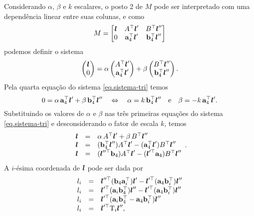 Considerando $\alpha$, $\beta$ e $k$ escalares, o posto 2 de $M$ pode ser interpretado com uma dependência linear entre suas colunas, e como
\begin{equation*}
M=
\begin{bmatrix}
\boldsymbol{l}&A^\top\boldsymbol{l}'&B^\top\boldsymbol{l}''\\
0&{\bf a}^\top_4\boldsymbol{l}'&
{\bf b}^\top_4\boldsymbol{l}''
\end{bmatrix}
\end{equation*}
podemos definir o sistema
\begin{equation}\label{eq.sistema-tri}
\begin{pmatrix}
\boldsymbol{l}\\
0
\end{pmatrix}
=
\alpha
\begin{pmatrix}
A^\top\boldsymbol{l}'\\
{\bf a}^\top_4\boldsymbol{l}'
\end{pmatrix}
+\beta
\begin{pmatrix}
B^\top\boldsymbol{l}''\\
{\bf b}^\top_4\boldsymbol{l}''
\end{pmatrix}.
\end{equation}
Pela quarta equação do sistema \ref{eq.sistema-tri} temos
\begin{equation*}
0=\alpha\,{\bf a}^\top_4\boldsymbol{l}'+\beta\,{\bf b}^\top_4\boldsymbol{l}''\quad\Leftrightarrow\quad\alpha=k\,{\bf b}^\top_4\boldsymbol{l}''\quad\text{e}\quad\beta=-k\,{\bf a}^\top_4\boldsymbol{l}'.
\end{equation*}
Substituindo os valores de $\alpha$ e $\beta$ nas três primeiras equações do sistema \ref{eq.sistema-tri} e desconsiderando o fator de escala $k$, temos
\begin{equation*}
\begin{array}{rcl}
\boldsymbol{l}&=&\alpha\,A^\top\boldsymbol{l}'+\beta\,B^\top\boldsymbol{l}''\\
\boldsymbol{l}&=&({\bf b}^\top_4\boldsymbol{l}'')A^\top\boldsymbol{l}'-({\bf a}^\top_4\boldsymbol{l}')B^\top\boldsymbol{l}''\\
\boldsymbol{l}&=&(\boldsymbol{l}''^\top{\bf b}_4)A^\top\boldsymbol{l}'-(\boldsymbol{l}'^\top{\bf a}_4)B^\top\boldsymbol{l}''
\end{array}.
\end{equation*}
A $i$-ésima coordenada de $\boldsymbol{l}$ pode ser dada por
\begin{equation*}
\begin{array}{rcl}
l_i&=&\boldsymbol{l}''^\top({\bf b}_4{\bf a}^\top_i)\boldsymbol{l}'-\boldsymbol{l}'^\top({\bf a}_4{\bf b}_i^\top)\boldsymbol{l}''\\
l_i&=&\boldsymbol{l}'^\top({\bf a}_i{\bf b}^\top_4)\boldsymbol{l}''-\boldsymbol{l}'^\top({\bf a}_4{\bf b}_i^\top)\boldsymbol{l}''\\
l_i&=&\boldsymbol{l}'^\top({\bf a}_i{\bf b}^\top_4-{\bf a}_4{\bf b}_i^\top)\boldsymbol{l}''\\
l_i&=&\boldsymbol{l}'^\top \mbox{T}_i\boldsymbol{l}'',
\end{array}
\end{equation*}
